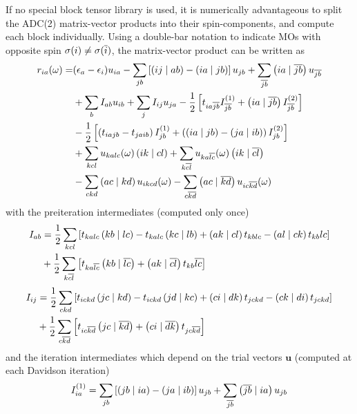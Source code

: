 If no special block tensor library is used, it is numerically advantageous to split the ADC(2) matrix-vector products into their spin-components, and compute each block individually. Using a double-bar notation to indicate MOs with opposite spin $\sigma(i) \neq \sigma(\overline{i})$, the matrix-vector product can be written as
\begin{equation}
\begin{split}
r_{ia}( \omega) = &(\epsilon_a - \epsilon_i) u_{ia} - \sum_{jb} \left[ \left( ij \mid ab \right) - \left( ia \mid jb \right) \right] u_{jb} + \sum_{\overline{jb}} \left( ia \mid \overline{jb} \right) u_{\overline{jb}} \\
&+ \sum_b I_{ab} u_{ib} + \sum_{j} I_{ij} u_{ja} - \frac{1}{2} \left[ t_{ia\overline{jb}} I^{(1)}_{\overline{jb}} + \left( ia \mid \overline{jb} \right) I_{\overline{jb}}^{(2)} \right] \\
&- \frac{1}{2} \left[ \left( t_{iajb} - t_{jaib} \right) I^{(1)}_{jb} + \left(\left( ia \mid jb \right) - \left( ja \mid ib \right) \right) I_{jb}^{(2)} \right] \\
&+ \sum_{kcl} u_{kalc}(\omega) \left( ik \mid cl \right) + \sum_{k\overline{cl}} u_{ka\overline{lc}}(\omega) \left( ik \mid \overline{cl} \right) \\
&- \sum_{ckd} \left( ac \mid kd \right) u_{ikcd}(\omega) - \sum_{c\overline{kd}} \left( ac \mid \overline{kd} \right) u_{ic\overline{kd}}(\omega)
\end{split}
\end{equation}  
\noindent with the preiteration intermediates (computed only once)
\begin{equation}
\begin{split}
I_{ab} &= \frac{1}{2} \sum_{kcl} \left[ t_{kalc} \left( kb \mid lc \right) - t_{kalc} \left( kc \mid lb \right) + \left( ak \mid cl \right) t_{kblc} - \left( al \mid ck \right) t_{kb}{lc} \right] \\
&+ \frac{1}{2} \sum_{k\overline{cl}} \left[ t_{ka\overline{lc}} \left( kb \mid \overline{lc} \right) + \left( ak \mid \overline{cl} \right) t_{kb}{\overline{lc}} \right] 
\end{split}
\end{equation}
\begin{equation}
\begin{split}
I_{ij} &= \frac{1}{2} \sum_{ckd} \left[ t_{ickd} \left( jc \mid kd \right) - t_{ickd} \left( jd \mid kc \right) + \left( ci \mid dk \right) t_{jckd} - \left( ck \mid di \right) t_{jckd} \right] \\
&+ \frac{1}{2} \sum_{c\overline{kd}} \left[ t_{ic\overline{kd}} \left( jc \mid \overline{kd} \right) + \left( ci \mid \overline{dk} \right) t_{jc\overline{kd}} \right]  
\end{split}
\end{equation}
\noindent and the iteration intermediates which depend on the trial vectors $\mathbf{u}$ (computed at each Davidson iteration)
\begin{equation}
I_{ia}^{(1)} = \sum_{jb} \left[ \left( jb \mid ia \right) - \left( ja \mid ib \right) \right] u_{jb} + \sum_{\overline{jb}} \left( \overline{jb} \mid ia \right) u_{jb}
\end{equation}
